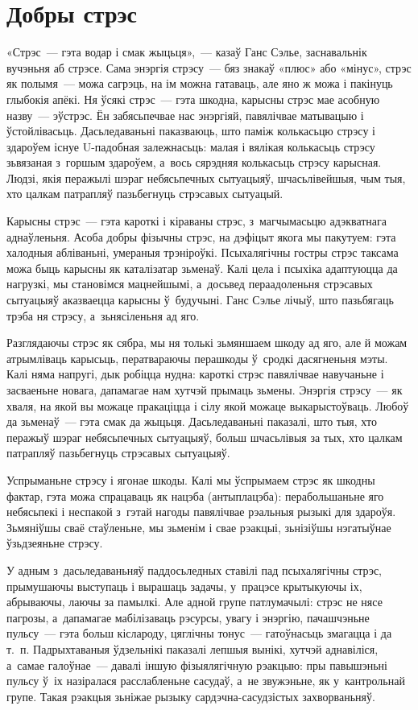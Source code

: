 \section{Добры стрэс}

«Стрэс~--- гэта водар і смак жыцьця»,~--- казаў Ганс Сэлье, заснавальнік вучэньня аб стрэсе. Сама энэргія стрэсу~--- бяз знакаў «плюс» або «мінус», стрэс як полымя~--- можа сагрэць, на ім можна гатаваць, але яно ж можа і пакінуць глыбокія апёкі. Ня ўсякі стрэс~--- гэта шкодна, карысны стрэс мае асобную назву~--- эўстрэс. Ён забясьпечвае нас энэргіяй, павялічвае матывацыю і ўстойлівасьць. Дасьледаваньні паказваюць, што паміж колькасьцю стрэсу і здароўем існуе U-падобная залежнасьць: малая і вялікая колькасьць стрэсу зьвязаная з~горшым здароўем, а~вось сярэдняя колькасьць стрэсу карысная. Людзі, якія перажылі шэраг небясьпечных сытуацыяў, шчасьлівейшыя, чым тыя, хто цалкам патрапляў пазьбегнуць стрэсавых сытуацый.

Карысны стрэс~--- гэта кароткі і кіраваны стрэс, з~магчымасьцю адэкватнага аднаўленьня. Асоба добры фізычны стрэс, на дэфіцыт якога мы пакутуем: гэта халодныя абліваньні, умераныя трэніроўкі. Псыхалягічны гостры стрэс таксама можа быць карысны як каталізатар зьменаў. Калі цела і псыхіка адаптуюцца да нагрузкі, мы становімся мацнейшымі, а~досьвед пераадоленьня стрэсавых сытуацыяў аказваецца карысны ў~будучыні. Ганс Сэлье лічыў, што пазьбягаць трэба ня стрэсу, а~зьнясіленьня ад яго.

Разглядаючы стрэс як сябра, мы ня толькі зьмяншаем шкоду ад яго, але й можам атрымліваць карысьць, ператвараючы перашкоды ў~сродкі дасягненьня мэты. Калі няма напругі, дык робіцца нудна: кароткі стрэс павялічвае навучаньне і засваеньне новага, дапамагае нам хутчэй прымаць зьмены. Энэргія стрэсу~--- як хваля, на якой вы можаце пракаціцца і сілу якой можаце выкарыстоўваць. Любоў да зьменаў~--- гэта смак да жыцьця. Дасьледаваньні паказалі, што тыя, хто перажыў шэраг небясьпечных сытуацыяў, больш шчасьлівыя за тых, хто цалкам патрапляў пазьбегнуць стрэсавых сытуацыяў.

Успрыманьне стрэсу і ягонае шкоды. Калі мы ўспрымаем стрэс як шкодны фактар, гэта можа спрацаваць як нацэба (антыплацэба): перабольшаньне яго небясьпекі і неспакой з~гэтай нагоды павялічвае рэальныя рызыкі для здароўя. Зьмяніўшы сваё стаўленьне, мы зьменім і свае рэакцыі, зьнізіўшы нэгатыўнае ўзьдзеяньне стрэсу.

У адным з~дасьледаваньняў паддосьледных ставілі пад псыхалягічны стрэс, прымушаючы выступаць і вырашаць задачы, у~працэсе крытыкуючы іх, абрываючы, лаючы за памылкі. Але адной групе патлумачылі: стрэс не нясе пагрозы, а~дапамагае мабілізаваць рэсурсы, увагу і энэргію, пачашчэньне пульсу~--- гэта больш кіслароду, цяглічны тонус~--- гатоўнасьць змагацца і да т.~п. Падрыхтаваныя ўдзельнікі паказалі лепшыя вынікі, хутчэй аднавіліся, а~самае галоўнае~--- давалі іншую фізыялягічную рэакцыю: пры павышэньні пульсу ў~іх назіралася расслабленьне сасудаў, а~не звужэньне, як у~кантрольнай групе. Такая рэакцыя зьніжае рызыку сардэчна-сасудзістых захворваньняў.

